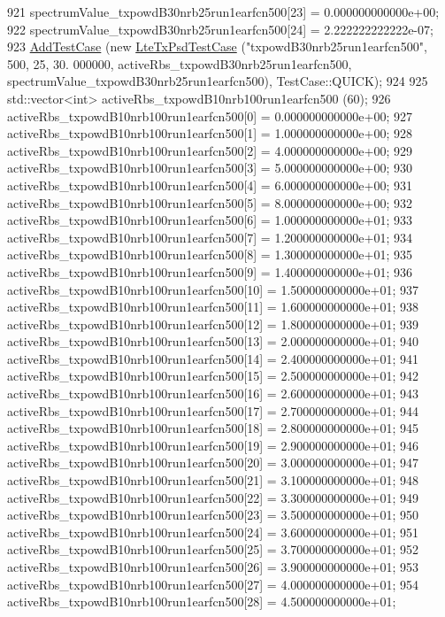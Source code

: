 \begin{DoxyCode}
921   spectrumValue\_txpowdB30nrb25run1earfcn500[23] = 0.000000000000e+00;
922   spectrumValue\_txpowdB30nrb25run1earfcn500[24] = 2.222222222222e-07;
923   \hyperlink{classns3_1_1TestCase_a3718088e3eefd5d6454569d2e0ddd835}{AddTestCase} (\textcolor{keyword}{new} \hyperlink{classLteTxPsdTestCase}{LteTxPsdTestCase} (\textcolor{stringliteral}{"txpowdB30nrb25run1earfcn500"}, 500, 25, 30.
      000000, activeRbs\_txpowdB30nrb25run1earfcn500, spectrumValue\_txpowdB30nrb25run1earfcn500), TestCase::QUICK);
924 
925   std::vector<int> activeRbs\_txpowdB10nrb100run1earfcn500 (60);
926   activeRbs\_txpowdB10nrb100run1earfcn500[0] = 0.000000000000e+00;
927   activeRbs\_txpowdB10nrb100run1earfcn500[1] = 1.000000000000e+00;
928   activeRbs\_txpowdB10nrb100run1earfcn500[2] = 4.000000000000e+00;
929   activeRbs\_txpowdB10nrb100run1earfcn500[3] = 5.000000000000e+00;
930   activeRbs\_txpowdB10nrb100run1earfcn500[4] = 6.000000000000e+00;
931   activeRbs\_txpowdB10nrb100run1earfcn500[5] = 8.000000000000e+00;
932   activeRbs\_txpowdB10nrb100run1earfcn500[6] = 1.000000000000e+01;
933   activeRbs\_txpowdB10nrb100run1earfcn500[7] = 1.200000000000e+01;
934   activeRbs\_txpowdB10nrb100run1earfcn500[8] = 1.300000000000e+01;
935   activeRbs\_txpowdB10nrb100run1earfcn500[9] = 1.400000000000e+01;
936   activeRbs\_txpowdB10nrb100run1earfcn500[10] = 1.500000000000e+01;
937   activeRbs\_txpowdB10nrb100run1earfcn500[11] = 1.600000000000e+01;
938   activeRbs\_txpowdB10nrb100run1earfcn500[12] = 1.800000000000e+01;
939   activeRbs\_txpowdB10nrb100run1earfcn500[13] = 2.000000000000e+01;
940   activeRbs\_txpowdB10nrb100run1earfcn500[14] = 2.400000000000e+01;
941   activeRbs\_txpowdB10nrb100run1earfcn500[15] = 2.500000000000e+01;
942   activeRbs\_txpowdB10nrb100run1earfcn500[16] = 2.600000000000e+01;
943   activeRbs\_txpowdB10nrb100run1earfcn500[17] = 2.700000000000e+01;
944   activeRbs\_txpowdB10nrb100run1earfcn500[18] = 2.800000000000e+01;
945   activeRbs\_txpowdB10nrb100run1earfcn500[19] = 2.900000000000e+01;
946   activeRbs\_txpowdB10nrb100run1earfcn500[20] = 3.000000000000e+01;
947   activeRbs\_txpowdB10nrb100run1earfcn500[21] = 3.100000000000e+01;
948   activeRbs\_txpowdB10nrb100run1earfcn500[22] = 3.300000000000e+01;
949   activeRbs\_txpowdB10nrb100run1earfcn500[23] = 3.500000000000e+01;
950   activeRbs\_txpowdB10nrb100run1earfcn500[24] = 3.600000000000e+01;
951   activeRbs\_txpowdB10nrb100run1earfcn500[25] = 3.700000000000e+01;
952   activeRbs\_txpowdB10nrb100run1earfcn500[26] = 3.900000000000e+01;
953   activeRbs\_txpowdB10nrb100run1earfcn500[27] = 4.000000000000e+01;
954   activeRbs\_txpowdB10nrb100run1earfcn500[28] = 4.500000000000e+01;

\end{DoxyCode}
